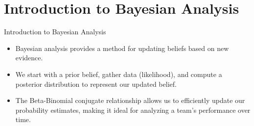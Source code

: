 \section{Introduction to Bayesian Analysis}

\begin{frame}{Introduction to Bayesian Analysis}

  \begin{itemize}
    \item Bayesian analysis provides a method for updating beliefs based on new evidence.
    \item We start with a prior belief, gather data (likelihood), and compute a posterior distribution to represent our updated belief.
    \item The Beta-Binomial conjugate relationship allows us to efficiently update our probability estimates, making it ideal for analyzing a team’s performance over time.
  \end{itemize}
  
\end{frame}
